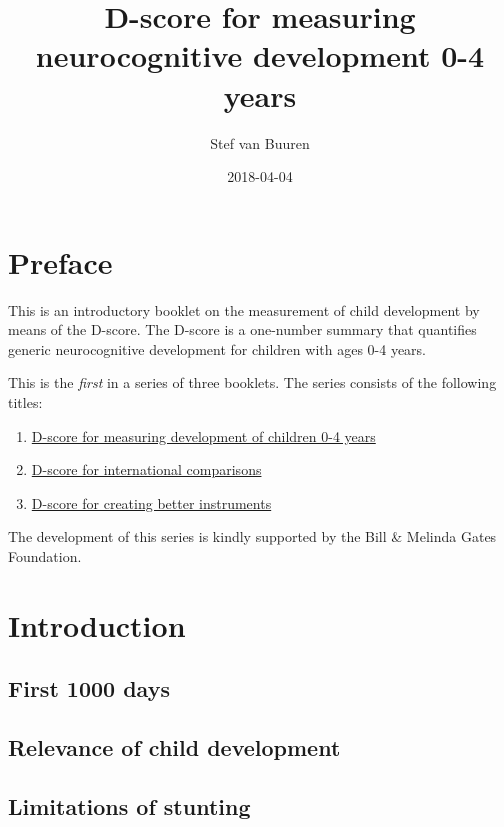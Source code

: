\documentclass[]{book}
\title{D-score for measuring neurocognitive development 0-4 years}
\author{Stef van Buuren}
\date{2018-04-04}
\providecommand{\tightlist}{%
  \setlength{\itemsep}{0pt}\setlength{\parskip}{0pt}}
\begin{document}
\maketitle

{
\setcounter{tocdepth}{1}
\tableofcontents
}
\chapter*{Preface}\label{preface}

This is an introductory booklet on the measurement of child development
by means of the D-score. The D-score is a one-number summary that
quantifies generic neurocognitive development for children with ages 0-4
years.

This is the \emph{first} in a series of three booklets. The series
consists of the following titles:

\begin{enumerate}
\def\labelenumi{\arabic{enumi}.}
\tightlist
\item
  \href{https://stefvanbuuren.github.io/dbook1/}{D-score for measuring
  development of children 0-4 years}
\item
  \href{https://stefvanbuuren.github.io/dbook2/}{D-score for
  international comparisons}
\item
  \href{https://stefvanbuuren.github.io/dbook3/}{D-score for creating
  better instruments}
\end{enumerate}

The development of this series is kindly supported by the Bill \&
Melinda Gates Foundation.

\chapter{Introduction}\label{intro}

\section{First 1000 days}\label{first-1000-days}

\section{Relevance of child
development}\label{relevance-of-child-development}

\section{Limitations of stunting}\label{limitations-of-stunting}
\end{document}
